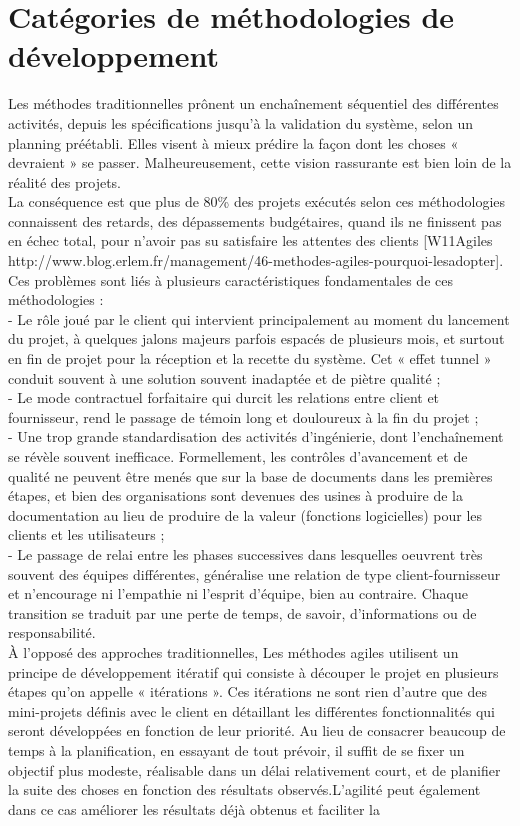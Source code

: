 \section{Catégories de méthodologies de développement}
Les méthodes traditionnelles prônent un enchaînement séquentiel des différentes activités, depuis les spécifications jusqu’à la validation du système, selon un planning préétabli. Elles visent à mieux prédire la façon dont les choses « devraient » se passer. Malheureusement, cette vision rassurante est bien loin de la réalité des projets.\\
La conséquence est que plus de 80\% des projets exécutés selon ces méthodologies connaissent des retards, des dépassements budgétaires, quand ils ne finissent pas en échec total, pour n’avoir pas su satisfaire les attentes des clients [W11Agiles http://www.blog.erlem.fr/management/46-methodes-agiles-pourquoi-lesadopter].
Ces problèmes sont liés à plusieurs caractéristiques fondamentales de ces méthodologies :\\
- Le rôle joué par le client qui intervient principalement au moment du lancement du projet, à quelques jalons majeurs parfois espacés de plusieurs mois, et surtout en fin de projet pour la réception et la recette du système. Cet « effet tunnel » conduit souvent à une solution souvent inadaptée et de piètre qualité ;\\
- Le mode contractuel forfaitaire qui durcit les relations entre client et fournisseur, rend le passage de témoin long et douloureux à la fin du projet ; \\
- Une trop grande standardisation des activités d’ingénierie, dont l’enchaînement se révèle souvent inefficace. Formellement, les contrôles d'avancement et de qualité ne peuvent être menés que sur la base de documents dans les premières étapes, et bien des organisations sont devenues des usines à produire de la documentation au lieu de produire de la valeur (fonctions logicielles) pour les clients et les utilisateurs ; \\
- Le passage de relai entre les phases successives dans lesquelles oeuvrent très souvent des équipes différentes, généralise une relation de type client-fournisseur et n’encourage ni l’empathie ni l’esprit d’équipe, bien au contraire. Chaque transition se traduit par une perte de temps, de savoir, d’informations ou de responsabilité.\\
À l’opposé des approches traditionnelles, Les méthodes agiles utilisent un principe de développement itératif qui consiste à découper le projet en plusieurs étapes qu’on appelle « itérations ». Ces itérations ne sont rien d’autre que des mini-projets définis avec le client en détaillant les différentes fonctionnalités qui seront développées en fonction de leur priorité. Au lieu de consacrer beaucoup de temps à la planification, en essayant de tout prévoir, il suffit de se fixer un objectif plus modeste, réalisable dans un délai relativement court, et de planifier la suite des choses en fonction des résultats observés.L’agilité peut également dans ce cas améliorer les résultats déjà obtenus et faciliter la
